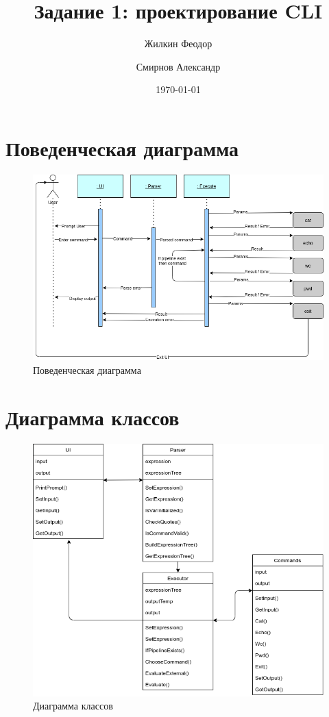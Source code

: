 \documentclass[a4paper,10pt]{article}
\title{Задание 1: проектирование CLI}
\author{
	Жилкин Феодор\\
	\and
	Смирнов Александр
}
\date{\today}
\begin{document}
\maketitle

\section*{Поведенческая диаграмма}

\begin{figure}[h]
	\centering
	\includegraphics[width=\textwidth]{images/activity_diagram.png}
	\caption{Поведенческая диаграмма}
	\centering
\end{figure}

\newpage

\section*{Диаграмма классов}

\begin{figure}[h]
	\centering
	\includegraphics[width=\textwidth]{images/class_diagram.png}
	\caption{Диаграмма классов}
	\centering
\end{figure}
\end{document}
